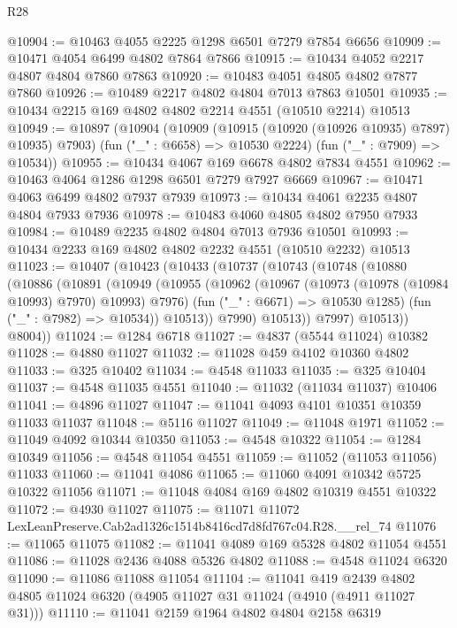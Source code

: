 \begin{lexlean}{R28}
\begin{coremodule}
@10904 := @10463 @4055 @2225 @1298 @6501 @7279 @7854 @6656
@10909 := @10471 @4054 @6499 @4802 @7864 @7866
@10915 := @10434 @4052 @2217 @4807 @4804 @7860 @7863
@10920 := @10483 @4051 @4805 @4802 @7877 @7860
@10926 := @10489 @2217 @4802 @4804 @7013 @7863 @10501
@10935 := @10434 @2215 @169 @4802 @4802 @2214 @4551 (@10510 @2214) @10513
@10949 := @10897
    (@10904
      (@10909 (@10915 (@10920 (@10926 @10935) @7897) @10935) @7903)
      (fun ("_" : @6658) => @10530 @2224)
      (fun ("_" : @7909) => @10534))
@10955 := @10434 @4067 @169 @6678 @4802 @7834 @4551
@10962 := @10463 @4064 @1286 @1298 @6501 @7279 @7927 @6669
@10967 := @10471 @4063 @6499 @4802 @7937 @7939
@10973 := @10434 @4061 @2235 @4807 @4804 @7933 @7936
@10978 := @10483 @4060 @4805 @4802 @7950 @7933
@10984 := @10489 @2235 @4802 @4804 @7013 @7936 @10501
@10993 := @10434 @2233 @169 @4802 @4802 @2232 @4551 (@10510 @2232) @10513
@11023 := @10407
    (@10423
      (@10433
        (@10737
          (@10743
            (@10748
              (@10880
                (@10886
                  (@10891
                    (@10949
                      (@10955
                        (@10962
                          (@10967 (@10973 (@10978 (@10984 @10993) @7970) @10993) @7976)
                          (fun ("_" : @6671) => @10530 @1285)
                          (fun ("_" : @7982) => @10534))
                        @10513))
                    @7990)
                  @10513))
              @7997)
            @10513))
        @8004))
@11024 := @1284 @6718
@11027 := @4837 (@5544 @11024) @10382
@11028 := @4880 @11027
@11032 := @11028 @459 @4102 @10360 @4802
@11033 := @325 @10402
@11034 := @4548 @11033
@11035 := @325 @10404
@11037 := @4548 @11035 @4551
@11040 := @11032 (@11034 @11037) @10406
@11041 := @4896 @11027
@11047 := @11041 @4093 @4101 @10351 @10359 @11033 @11037
@11048 := @5116 @11027
@11049 := @11048 @1971
@11052 := @11049 @4092 @10344 @10350
@11053 := @4548 @10322
@11054 := @1284 @10349
@11056 := @4548 @11054 @4551
@11059 := @11052 (@11053 @11056) @11033
@11060 := @11041 @4086
@11065 := @11060 @4091 @10342 @5725 @10322 @11056
@11071 := @11048 @4084 @169 @4802 @10319 @4551 @10322
@11072 := @4930 @11027
@11075 := @11071 @11072 LexLeanPreserve.Cab2ad1326c1514b8416cd7d8fd767c04.R28.__rel_74
@11076 := @11065 @11075
@11082 := @11041 @4089 @169 @5328 @4802 @11054 @4551
@11086 := @11028 @2436 @4088 @5326 @4802
@11088 := @4548 @11024 @6320
@11090 := @11086 @11088 @11054
@11104 := @11041
    @419
    @2439
    @4802
    @4805
    @11024
    @6320
    (@4905 @11027 @31 @11024 (@4910 (@4911 @11027 @31)))
@11110 := @11041 @2159 @1964 @4802 @4804 @2158 @6319

\end{coremodule}
\end{lexlean}
